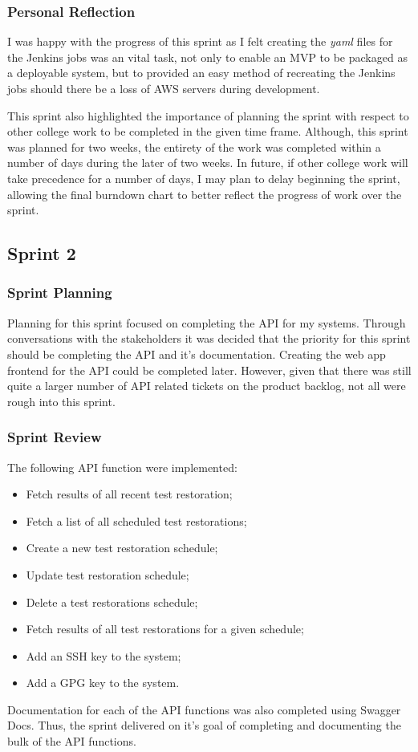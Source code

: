 		\subsubsection{Personal Reflection}
		I was happy with the progress of this sprint as I felt creating the \textit{yaml} files for the Jenkins jobs was an vital task, not only to enable an MVP to be packaged as a deployable system, but to provided an easy method of recreating the Jenkins jobs should there be a loss of AWS servers during development.
		
		This sprint also highlighted the importance of planning the sprint with respect to other college work to be completed in the given time frame. Although, this sprint was planned for two weeks, the entirety of the work was completed within a number of days during the later of two weeks. In future, if other college work will take precedence for a number of days, I may plan to delay beginning the sprint, allowing the final burndown chart to better reflect the progress of work over the sprint.
    
  \subsection{Sprint 2}
  \subsubsection{Sprint Planning}
  Planning for this sprint focused on completing the API for my systems. Through conversations with the stakeholders it was decided that the priority for this sprint should be completing the API and it's documentation. Creating the web app frontend for the API could be completed later. However, given that there was still quite a larger number of API related tickets on the product backlog, not all were rough into this sprint.
  
  \subsubsection{Sprint Review}
  The following API function were implemented:
  \begin{itemize}
    \item Fetch results of all recent test restoration;
    \item Fetch a list of all scheduled test restorations;
    \item Create a new test restoration schedule;
    \item Update test restoration schedule;
    \item Delete a test restorations schedule;
    \item Fetch results of all test restorations for a given schedule;
    \item Add an SSH key to the system;
    \item Add a GPG key to the system.
  \end{itemize}
  Documentation for each of the API functions was also completed using Swagger Docs. Thus, the sprint delivered on it's goal of completing and documenting the bulk of the API functions.
  
